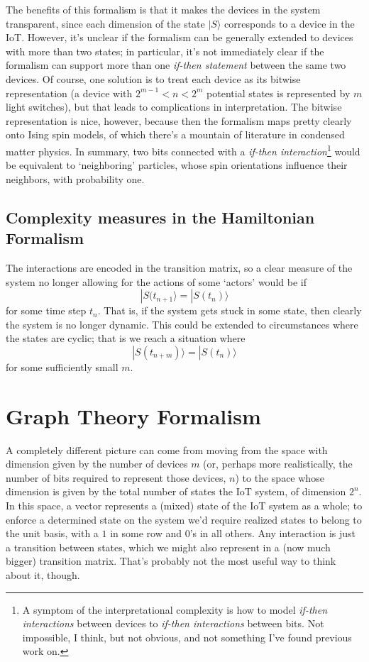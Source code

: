 \documentclass{article}
\def\be{\begin{equation*}}
\def\ee{\end{equation*}}
\begin{document}
The benefits of this formalism is that it makes the devices in the system transparent, since each dimension of the state $|S\rangle$ corresponds to a device in the IoT. However, it's unclear if the formalism can be generally extended to devices with more than two states; in particular, it's not immediately clear if the formalism can support more than one \textit{if-then statement} between the same two devices. Of course, one solution is to treat each device as its bitwise representation (a device with $2^{m-1} < n < 2^m$ potential states is represented by $m$ light switches), but that leads to complications in interpretation. The bitwise representation is nice, however, because then the formalism maps pretty clearly onto Ising spin models, of which there's a mountain of literature in condensed matter physics. In summary, two bits connected with a \textit{if-then interaction}\footnote{A symptom of the interpretational complexity is how to model \textit{if-then interactions} between devices to \textit{if-then interactions} between bits. Not impossible, I think, but not obvious, and not something I've found previous work on.} would be equivalent to `neighboring' particles, whose spin orientations influence their neighbors, with probability one.
\subsection{Complexity measures in the Hamiltonian Formalism}
The interactions are encoded in the transition matrix, so a clear measure of the system no longer allowing for the actions of some `actors' would be if 
\be
|S(t_{n+1}\rangle = |S(t_n)\rangle
\ee
for some time step $t_n$. That is, if the system gets stuck in some state, then clearly the system is no longer dynamic. This could be extended to circumstances where the states are cyclic; that is we reach a situation where
\be
|S(t_{n+m})\rangle = |S(t_n)\rangle
\ee
for some sufficiently small $m$.

\section{Graph Theory Formalism}
A completely different picture can come from moving from the space with dimension given by the number of devices $m$ (or, perhaps more realistically, the number of bits required to represent those devices, $n$) to the space whose dimension is given by the total number of states the IoT system, of dimension $2^n$. In this space, a vector represents a (mixed) state of the IoT system as a whole; to enforce a determined state on the system we'd require realized states to belong to the unit basis, with a $1$ in some row and $0$'s in all others. Any interaction is just a transition between states, which we might also represent in a (now much bigger) transition matrix. That's probably not the most useful way to think about it, though.
\end{document}
